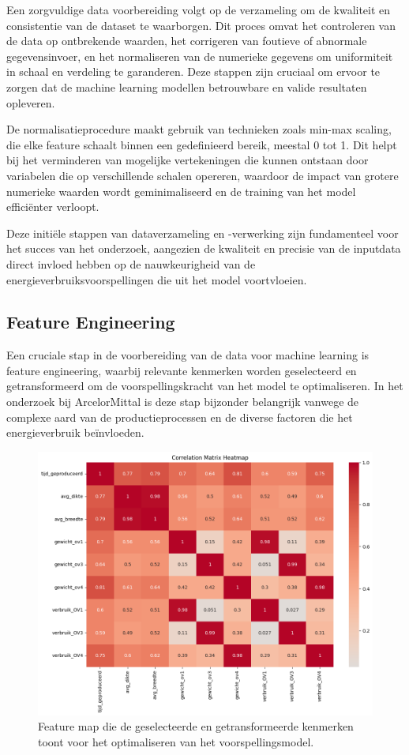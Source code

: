 Een zorgvuldige data voorbereiding volgt op de verzameling om de kwaliteit en consistentie van de dataset te waarborgen. Dit proces omvat het controleren van de data op ontbrekende waarden, het corrigeren van foutieve of abnormale gegevensinvoer, en het normaliseren van de numerieke gegevens om uniformiteit in schaal en verdeling te garanderen. Deze stappen zijn cruciaal om ervoor te zorgen dat de machine learning modellen betrouwbare en valide resultaten opleveren.

De normalisatieprocedure maakt gebruik van technieken zoals min-max scaling, die elke feature schaalt binnen een gedefinieerd bereik, meestal 0 tot 1. Dit helpt bij het verminderen van mogelijke vertekeningen die kunnen ontstaan door variabelen die op verschillende schalen opereren, waardoor de impact van grotere numerieke waarden wordt geminimaliseerd en de training van het model efficiënter verloopt.

Deze initiële stappen van dataverzameling en -verwerking zijn fundamenteel voor het succes van het onderzoek, aangezien de kwaliteit en precisie van de inputdata direct invloed hebben op de nauwkeurigheid van de energieverbruiksvoorspellingen die uit het model voortvloeien.

\subsection{Feature Engineering}
Een cruciale stap in de voorbereiding van de data voor machine learning is feature engineering, waarbij relevante kenmerken worden geselecteerd en getransformeerd om de voorspellingskracht van het model te optimaliseren. In het onderzoek bij ArcelorMittal is deze stap bijzonder belangrijk vanwege de complexe aard van de productieprocessen en de diverse factoren die het energieverbruik beïnvloeden.

\begin{figure}[h!]
    \centering
    \includegraphics[width=\textwidth]{graphics/FeatureMap.png}
    \caption{Feature map die de geselecteerde en getransformeerde kenmerken toont voor het optimaliseren van het voorspellingsmodel.}
    \label{fig:FeatureMap}
\end{figure}

